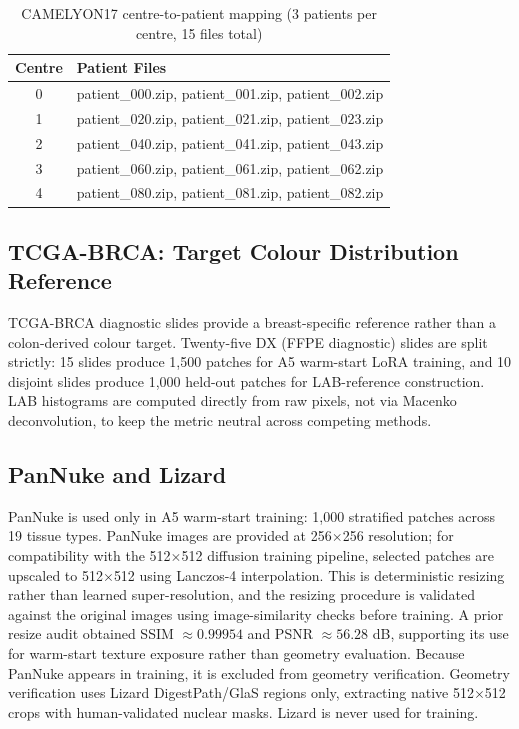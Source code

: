 \documentclass[a4paper,twoside,12pt]{report}
\begin{document}
\begin{table}[ht]
\centering
\small
\setlength{\tabcolsep}{4pt}
\caption{CAMELYON17 centre-to-patient mapping (3 patients per centre, 15 files total)}
\label{tab:camelyon}
\begin{tabularx}{0.85\textwidth}{cY}
\toprule
\textbf{Centre} & \textbf{Patient Files} \\
 & patient\_000.zip, patient\_001.zip, patient\_002.zip \\
1 & patient\_020.zip, patient\_021.zip, patient\_023.zip \\
2 & patient\_040.zip, patient\_041.zip, patient\_043.zip \\
3 & patient\_060.zip, patient\_061.zip, patient\_062.zip \\
4 & patient\_080.zip, patient\_081.zip, patient\_082.zip \\
\bottomrule
\end{tabularx}
\end{table}

\subsection{TCGA-BRCA: Target Colour Distribution Reference}

TCGA-BRCA diagnostic slides provide a breast-specific reference rather than a colon-derived colour target. Twenty-five DX (FFPE diagnostic) slides are split strictly: 15 slides produce 1{,}500 patches for A5 warm-start LoRA training, and 10 disjoint slides produce 1{,}000 held-out patches for LAB-reference construction. LAB histograms are computed directly from raw pixels, not via Macenko deconvolution, to keep the metric neutral across competing methods.

\subsection{PanNuke and Lizard}

PanNuke \citep{gamper2019pannuke} is used only in A5 warm-start training: 1{,}000 stratified patches across 19 tissue types. PanNuke images are provided at 256$\times$256 resolution; for compatibility with the 512$\times$512 diffusion training pipeline, selected patches are upscaled to 512$\times$512 using Lanczos-4 interpolation. This is deterministic resizing rather than learned super-resolution, and the resizing procedure is validated against the original images using image-similarity checks before training. A prior resize audit obtained SSIM $\approx 0.99954$ and PSNR $\approx 56.28$ dB, supporting its use for warm-start texture exposure rather than geometry evaluation. Because PanNuke appears in training, it is excluded from geometry verification. Geometry verification uses Lizard \citep{graham2021lizard} DigestPath/GlaS regions only, extracting native 512$\times$512 crops with human-validated nuclear masks. Lizard is never used for training.
\end{document}
